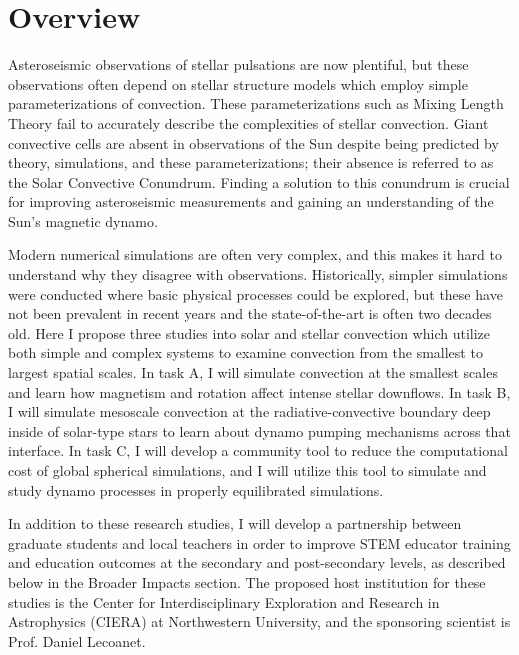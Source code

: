 \documentclass[aasms,11pt]{article}
\begin{document}
\section{Overview}
\vspace{-11pt}
Asteroseismic observations of stellar pulsations are now plentiful, but these observations often depend on stellar structure models which employ simple parameterizations of convection. 
These parameterizations such as Mixing Length Theory fail to accurately describe the complexities of stellar convection.
Giant convective cells are absent in observations of the Sun despite being predicted by theory, simulations, and these parameterizations; their absence is referred to as the Solar Convective Conundrum.
Finding a solution to this conundrum is crucial for improving asteroseismic measurements and gaining an understanding of the Sun's magnetic dynamo.

Modern numerical simulations are often very complex, and this makes it hard to understand why they disagree with observations.
Historically, simpler simulations were conducted where basic physical processes could be explored, but these have not been prevalent in recent years and the state-of-the-art is often two decades old.
Here I propose three studies into solar and stellar convection which utilize both simple and complex systems to examine convection from the smallest to largest spatial scales.
In task A, I will simulate convection at the smallest scales and learn how magnetism and rotation affect intense stellar downflows. 
In task B, I will simulate mesoscale convection at the radiative-convective boundary deep inside of solar-type stars to learn about dynamo pumping mechanisms across that interface. 
In task C, I will develop a community tool to reduce the computational cost of global spherical simulations, and I will utilize this tool to simulate and study dynamo processes in properly equilibrated simulations.

In addition to these research studies, I will develop a partnership between graduate students and local teachers in order to improve STEM educator training and education outcomes at the secondary and post-secondary levels, as described below in the Broader Impacts section. 
The proposed host institution for these studies is the Center for Interdisciplinary Exploration and Research in Astrophysics (CIERA) at Northwestern University, and the sponsoring scientist is Prof. Daniel Lecoanet.

\vspace{-7pt}
\end{document}
